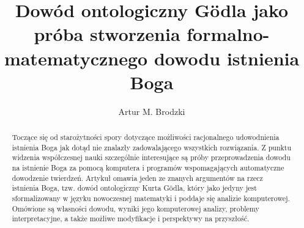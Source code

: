 \documentclass[runningheads]{llncs}
\begin{document}
\title{
	Dowód ontologiczny G\"odla jako próba stworzenia formalno-matematycznego dowodu istnienia Boga
}

\author{
	Artur M. Brodzki \\ 
}

%
\maketitle

\begin{abstract}
Toczące się od starożytności spory dotyczące możliwości racjonalnego udowodnienia istnienia Boga jak dotąd nie znalazły zadowalającego wszystkich rozwiązania. Z punktu widzenia współczesnej nauki szczególnie interesujące są próby przeprowadzenia dowodu na istnienie Boga za pomocą komputera i programów wspomagających automatyczne dowodzenie twierdzeń. Artykuł omawia jeden ze znanych argumentów na rzecz istnienia Boga, tzw. dowód ontologiczny Kurta G\"odla, który jako jedyny jest sformalizowany w języku nowoczesnej matematyki i poddaje się analizie komputerowej. Omówione są własności dowodu, wyniki jego komputerowej analizy, problemy interpretacyjne, a także możliwe modyfikacje i perspektywy na przyszłość. 

\end{abstract}
\end{document}
